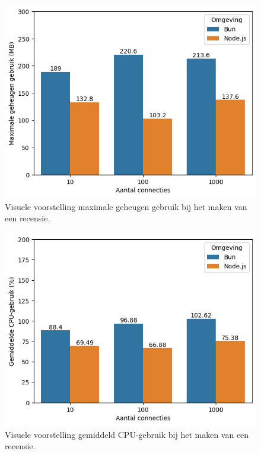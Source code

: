   \begin{figure}[H]
    \centering
    \includegraphics{graphics/PostPostgresRAM.png}
    \caption{\label{fig:postgeheugenpostgres}Visuele voorstelling maximale geheugen gebruik bij het maken van een recensie.}
  \end{figure}
  \begin{figure}[H]
    \centering
    \includegraphics{graphics/PostMySqlCpu.png}
    \caption{\label{fig:postcpupostgres}Visuele voorstelling gemiddeld CPU-gebruik bij het maken van een recensie.}
  \end{figure}
